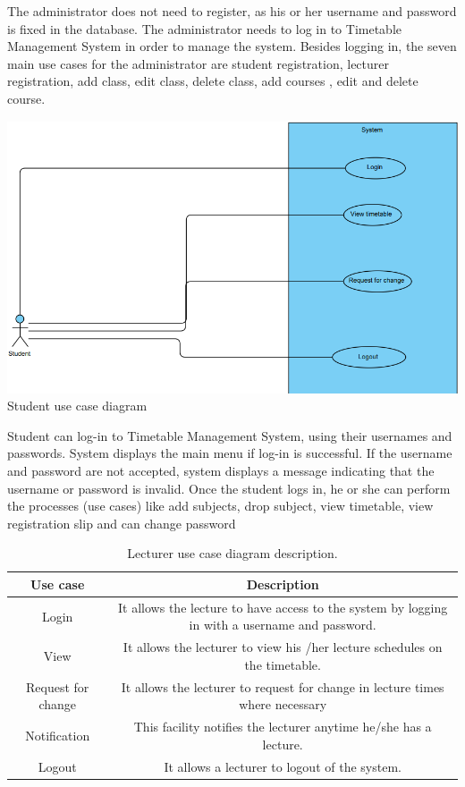 \documentclass{scrreprt}
\begin{document}
The administrator does not need to register, as his or her username and password is
fixed in the database. The administrator needs to log in to Timetable Management
System in order to manage the system. Besides logging in, the seven main use cases for
the administrator are student registration, lecturer registration, add class, edit class,
delete class, add courses , edit  and delete course.
 \begin{center}
\includegraphics[scale=0.6]{student.png}
Student use case diagram
\end{center}
Student can log-in to Timetable Management System, using their usernames and
passwords. System displays the main menu if log-in is successful. If the username and
password are not accepted, system displays a message indicating that the username or
password is invalid. Once the student logs in, he or she can perform the processes (use
cases) like add subjects, drop subject, view timetable, view registration slip and can
change password

\begin{table}[h!]
  \begin{center}
    \caption{Lecturer use case diagram description.}
    \label{tab:table1}
    \begin{tabular}{|c|c|} 
\hline
      \textbf{Use case} & \textbf{Description} \\
 
      \hline
     Login& It allows the lecture to have access to the system by logging in with a username and password. \\
\hline
      View  &  It allows the lecturer to view his /her lecture schedules on the  timetable.\\
\hline
       Request for change& It allows the lecturer to request for change in lecture times  where necessary\\
\hline
Notification&This facility notifies the lecturer anytime he/she has a lecture.\\
\hline
Logout&  It allows a lecturer to logout of the system.\\
\hline
  \end{tabular}
  \end{center}
\end{table}
\end{document}
